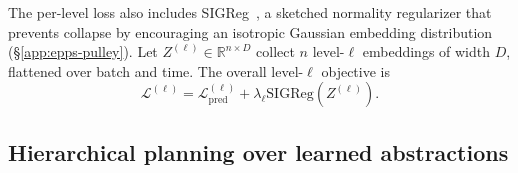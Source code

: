 The per-level loss also includes SIGReg~\citep{balestriero2025lejepa}, a sketched
normality regularizer that prevents collapse by encouraging an isotropic
Gaussian embedding distribution (\S\ref{app:epps-pulley}). Let $Z^{(\ell)} \in \mathbb{R}^{n \times D}$
collect $n$ level-$\ell$ embeddings of width $D$, flattened over batch and time. The overall level-$\ell$ objective is
\begin{equation}
\label{eq:level-obj}
\mathcal{L}^{(\ell)}
= \mathcal{L}^{(\ell)}_{\mathrm{pred}}
+ \lambda_\ell \mathrm{SIGReg}\!\left(Z^{(\ell)}\right).
\end{equation}

\subsection{Hierarchical planning over learned abstractions}
\label{sec:method-planning}

